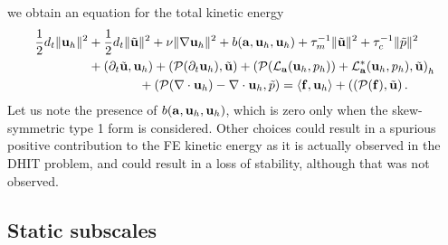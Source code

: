 we obtain an equation for the total kinetic energy
\begin{align}
\label{eq-C4_total_balance}
   \frac{1}{2}d_t\|{\bf u}_h\|^2
& +\frac{1}{2}d_t\|\tilde{{\bf u}}\|^2
  +\nu\|\nabla{\bf u}_h\|^2+b({\bf a},{\bf u}_h,{\bf u}_h)
  +\tau_m^{-1}\|\tilde{{\bf u}}\|^2+\tau_c^{-1}\|\tilde{p}\|^2 \\ \nonumber
& +(\partial_t\tilde{{\bf u}},{\bf u}_h)
  +\left(\mathcal{P}(\partial_t{\bf u}_h),\tilde{{\bf u}}\right)
  +\left(\mathcal{P}(\mathcal{L}_{{\bf a}}({\bf u}_h,p_h))+\mathcal{L}^*_{{\bf a}}({\bf u}_h,p_h),\tilde{{\bf u}}\right)_h\\ \nonumber
& \quad \quad \quad \quad  +\left(\mathcal{P}(\nabla\cdot{\bf u}_h)-\nabla\cdot{\bf u}_h,\tilde{p}\right)=\left<\mathbf{f},\mathbf{u}_h\right>+\left((\mathcal{P}({\bf f}),\tilde{{\bf u}}\right).
\end{align}
Let us note the presence of $b({\bf a},{\bf u}_h,{\bf u}_h)$, which is zero only when the skew-symmetric type 1 form is considered. Other choices could result in a spurious positive contribution to the FE kinetic energy as it is actually observed in the DHIT problem, and could result in a loss of stability, although that was not observed.

\subsection{Static subscales} 

